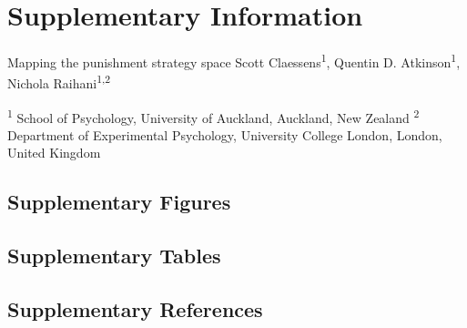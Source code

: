 \documentclass[
  man,floatsintext]{apa6}
\begin{document}
\hypertarget{supplementary-information}{%
\section{\texorpdfstring{\textbf{Supplementary Information}}{Supplementary Information}}\label{supplementary-information}}

\setcounter{page}{1}
\centering

\noindent \hspace*{10mm} \small Mapping the punishment strategy space \newline
\hspace*{1cm} \small Scott Claessens\textsuperscript{1}, Quentin D. Atkinson\textsuperscript{1}, Nichola Raihani\textsuperscript{1,2} \newline

\raggedright

\noindent \footnotesize \textsuperscript{1} School of Psychology, University of Auckland, Auckland, New Zealand \newline
\noindent \footnotesize \textsuperscript{2} Department of Experimental Psychology, University College London, London, United Kingdom \newline
\normalsize
\newpage

\hypertarget{supplementary-figures}{%
\subsection{Supplementary Figures}\label{supplementary-figures}}

\hypertarget{supplementary-tables}{%
\subsection{Supplementary Tables}\label{supplementary-tables}}

\hypertarget{supplementary-references}{%
\subsection{Supplementary References}\label{supplementary-references}}
\end{document}
